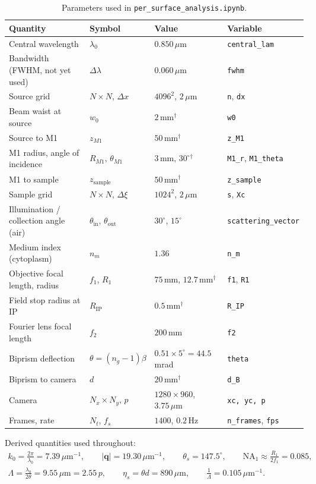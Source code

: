 \documentclass[11pt,a4paper]{article}
\newcommand{\vq}{\mathbf{q}}
\newcommand{\um}{\,\mu\mathrm{m}}
\newcommand{\mm}{\,\mathrm{mm}}
\newcommand{\code}[1]{\texttt{\small #1}}
\begin{document}
\begin{table}[ht]
\centering
\small
\caption{Parameters used in \code{per\_surface\_analysis.ipynb}.}
\label{tab:params}
\begin{tabular}{@{}llll@{}}
\toprule
Quantity & Symbol & Value & Variable \\
\midrule
Central wavelength & $\lambda_0$ & $0.850\um$ & \code{central\_lam} \\
Bandwidth (FWHM, not yet used) & $\Delta\lambda$ & $0.060\um$ & \code{fwhm} \\
Source grid & $N\times N$, $\Delta x$ & $4096^2$, $2\um$ & \code{n}, \code{dx} \\
Beam waist at source & $w_0$ & $2\mm$$^\dagger$ & \code{w0} \\
Source to M1 & $z_{M1}$ & $50\mm$$^\dagger$ & \code{z\_M1} \\
M1 radius, angle of incidence & $R_{M1}$, $\theta_{M1}$ & $3\mm$, $30^\circ$$^\dagger$ & \code{M1\_r}, \code{M1\_theta} \\
M1 to sample & $z_\mathrm{sample}$ & $50\mm$$^\dagger$ & \code{z\_sample} \\
Sample grid & $N\times N$, $\Delta\xi$ & $1024^2$, $2\um$ & \code{s}, \code{Xc} \\
Illumination / collection angle (air) & $\theta_\mathrm{in}$, $\theta_\mathrm{out}$ & $30^\circ$, $15^\circ$ & \code{scattering\_vector} \\
Medium index (cytoplasm) & $n_m$ & $1.36$ & \code{n\_m} \\
Objective focal length, radius & $f_1$, $R_1$ & $75\mm$, $12.7\mm$$^\dagger$ & \code{f1}, \code{R1} \\
Field stop radius at IP & $R_\mathrm{IP}$ & $0.5\mm$$^\dagger$ & \code{R\_IP} \\
Fourier lens focal length & $f_2$ & $200\mm$ & \code{f2} \\
Biprism deflection & $\theta = (n_g-1)\beta$ & $0.51\times5^\circ = 44.5\,$mrad & \code{theta} \\
Biprism to camera & $d$ & $20\mm$$^\dagger$ & \code{d\_B} \\
Camera & $N_x\times N_y$, $p$ & $1280\times960$, $3.75\um$ & \code{xc, yc, p} \\
Frames, rate & $N_t$, $f_s$ & $1400$, $0.2\,$Hz & \code{n\_frames}, \code{fps} \\
\bottomrule
\end{tabular}
\end{table}

Derived quantities used throughout:
\begin{gather*}
k_0 = \frac{2\pi}{\lambda_0} = 7.39\um^{-1},\qquad
|\vq| = 19.30\um^{-1},\qquad
\theta_s = 147.5^\circ,\qquad
\mathrm{NA}_1 \approx \frac{R_1}{2f_1} = 0.085,\\
\Lambda = \frac{\lambda_0}{2\theta} = 9.55\um = 2.55\,p,\qquad
\eta_s = \theta d = 890\um,\qquad
\frac{1}{\Lambda} = 0.105\um^{-1}.
\end{gather*}
\end{document}
